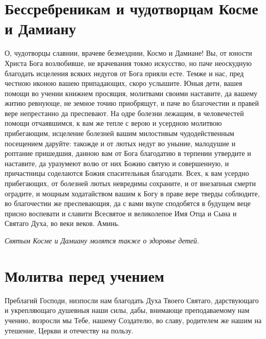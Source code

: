 \section{Бессребреникам и чудотворцам Косме и Дамиану}\begin{mymulticols}




О, чудотворцы славнии, врачеве безмезднии, Космо и Дамиане! Вы, от юности Христа Бога возлюбивше, не врачевания токмо искусство, но паче неоскудную благодать исцеления всяких недугов от Бога прияли есте. Темже и нас, пред честною иконою вашею припадающих, скоро услышите. Юныя дети, вашея помощи во учении книжнем просящия, молитвами своими наставите, да вашему житию ревнующе, не земное точию приобрящут, и паче во благочестии и правей вере непрестанно да преспевают. На одре болезни лежащим, в человечестей помощи отчаявшимся, к вам же тепле с верою и усердною молитвою прибегающим, исцеление болезней вашим милостивым чудодейственным посещением даруйте: такожде и от лютых недуг во уныние, малодушие и роптание пришедшия, данною вам от Бога благодатию в терпении утвердите и наставите, да уразумеют волю от них Божию святую и совершенную, и причастницы соделаются Божия спасительныя благодати. Всех, к вам усердно прибегающих, от болезней лютых невредимы сохраните, и от внезапныя смерти оградите, и мощным ходатайством вашим к Богу в праве вере тверды соблюдите, во благочестии же преспевающия, да с вами вкупе сподобятся в будущем веце присно воспевати и славити Всесвятое и великолепое Имя Отца и Сына и Святаго Духа, во веки веков. Аминь.

\itshape Святым Косме и Дамиану молятся также о здоровье детей.\normalfont{}

\end{mymulticols}

\mychapterending





\section{Молитва перед учением}\begin{mymulticols}



Преблагий Господи, низпосли нам благодать Духа Твоего Святаго, дарствующаго и укрепляющаго душевныя наши силы, дабы, внимающе преподаваемому нам учению, возросли мы Тебе, нашему Создателю, во славу, родителем же нашим на утешение, Церкви и отечеству на пользу.


\end{mymulticols}

